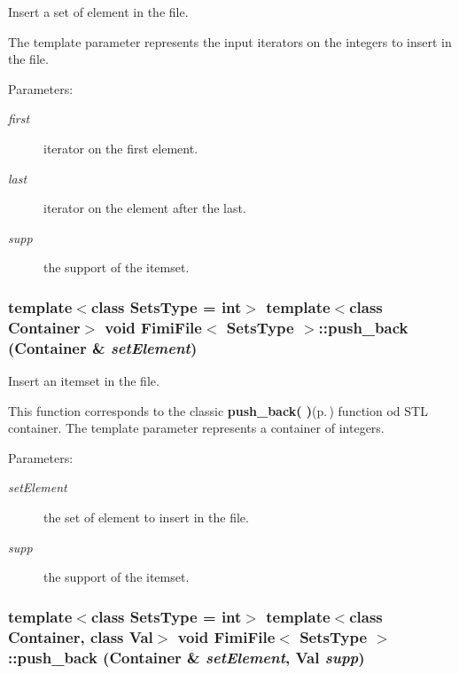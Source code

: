 Insert a set of element in the file. 

The template parameter represents the input iterators on the integers to insert in the file. \begin{Desc}
\item[Parameters:]
\begin{description}
\item[{\em first}]iterator on the first element. \item[{\em last}]iterator on the element after the last. \item[{\em supp}]the support of the itemset. \end{description}
\end{Desc}
\subsubsection{\setlength{\rightskip}{0pt plus 5cm}template$<$class Sets\-Type = int$>$ template$<$class Container$>$ void {\bf Fimi\-File}$<$ Sets\-Type $>$::push\_\-back (Container \& {\em set\-Element})\hspace{0.3cm}{\tt  [inline]}}\label{class_fimi_file_dae7226e9737797a445300151a5dd907}


Insert an itemset in the file. 

This function corresponds to the classic {\bf push\_\-back( )}{\rm (p.\,\pageref{class_fimi_file_72dce2f4bf0815c28fe52c951e51a1e0})} function od STL container. The template parameter represents a container of integers. \begin{Desc}
\item[Parameters:]
\begin{description}
\item[{\em set\-Element}]the set of element to insert in the file. \item[{\em supp}]the support of the itemset. \end{description}
\end{Desc}
\subsubsection{\setlength{\rightskip}{0pt plus 5cm}template$<$class Sets\-Type = int$>$ template$<$class Container, class Val$>$ void {\bf Fimi\-File}$<$ Sets\-Type $>$::push\_\-back (Container \& {\em set\-Element}, Val {\em supp})\hspace{0.3cm}{\tt  [inline]}}\label{class_fimi_file_72dce2f4bf0815c28fe52c951e51a1e0}


